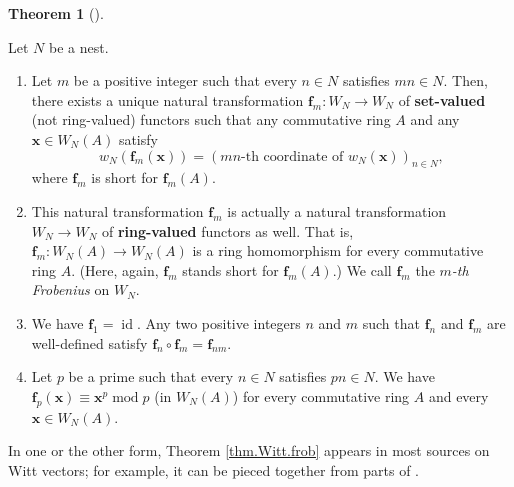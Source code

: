 \documentclass[numbers=enddot,12pt,final,onecolumn,notitlepage]{scrartcl}%
\theoremstyle{definition}
\newtheorem{theo}{Theorem}[section]
\newenvironment{theorem}[1][]
{\begin{theo}[#1]\begin{leftbar}}
{\end{leftbar}\end{theo}}
\newenvironment{noncompile}{}{}
\begin{document}
\begin{theorem}
\label{thm.Witt.frob}Let $N$ be a nest.

\begin{enumerate}
\item[\textbf{(a)}] Let $m$ be a positive integer such that every $n\in N$
satisfies $mn\in N$. Then, there exists a unique natural transformation
$\mathbf{f}_{m}:W_{N}\rightarrow W_{N}$ of \textbf{set-valued} (not
ring-valued) functors such that any commutative ring $A$ and any
$\mathbf{x}\in W_{N}\left(  A\right)  $ satisfy%
\[
w_{N}\left(  \mathbf{f}_{m}\left(  \mathbf{x}\right)  \right)  =\left(
mn\text{-th coordinate of }w_{N}\left(  \mathbf{x}\right)  \right)  _{n\in
N},
\]
where $\mathbf{f}_{m}$ is short for $\mathbf{f}_{m}\left(  A\right)  $.

\item[\textbf{(b)}] This natural transformation $\mathbf{f}_{m}$ is actually a
natural transformation $W_{N}\rightarrow W_{N}$ of \textbf{ring-valued}
functors as well. That is, $\mathbf{f}_{m}:W_{N}\left(  A\right)  \rightarrow
W_{N}\left(  A\right)  $ is a ring homomorphism for every commutative ring
$A$. (Here, again, $\mathbf{f}_{m}$ stands short for $\mathbf{f}_{m}\left(
A\right)  $.) We call $\mathbf{f}_{m}$ the $m$\textit{-th Frobenius} on
$W_{N}$.

\item[\textbf{(c)}] We have $\mathbf{f}_{1}=\operatorname*{id}$. Any two
positive integers $n$ and $m$ such that $\mathbf{f}_{n}$ and $\mathbf{f}_{m}$
are well-defined satisfy $\mathbf{f}_{n}\circ\mathbf{f}_{m}=\mathbf{f}_{nm}$.

\item[\textbf{(d)}] Let $p$ be a prime such that every $n\in N$ satisfies
$pn\in N$. We have $\mathbf{f}_{p}\left(  \mathbf{x}\right)  \equiv
\mathbf{x}^{p}\operatorname{mod}p$ (in $W_{N}\left(  A\right)  $) for every
commutative ring $A$ and every $\mathbf{x}\in W_{N}\left(  A\right)  $.
\end{enumerate}
\end{theorem}

In one or the other form, Theorem \ref{thm.Witt.frob} appears in most sources
on Witt vectors; for example, it can be pieced together from parts of
\cite[Theorem 5.7, Proposition 5.9 and Proposition 5.12]{rabinoff-witt}.

\begin{noncompile}
[By the way, what if we loosen the \textquotedblleft$n\in N\Longrightarrow
mn\in N$\textquotedblright\ condition in Theorem \ref{thm.Witt.frob}? I feel
we should get something like partial Frobenii $\mathbf{f}_{m}:W_{N}\left(
A\right)  \rightarrow W_{N/m}\left(  A\right)  $, where $N/m=\left\{
k\in\mathbb{N}_{+}\ \mid\ mk\in N\right\}  $.]
\end{noncompile}
\end{document}

